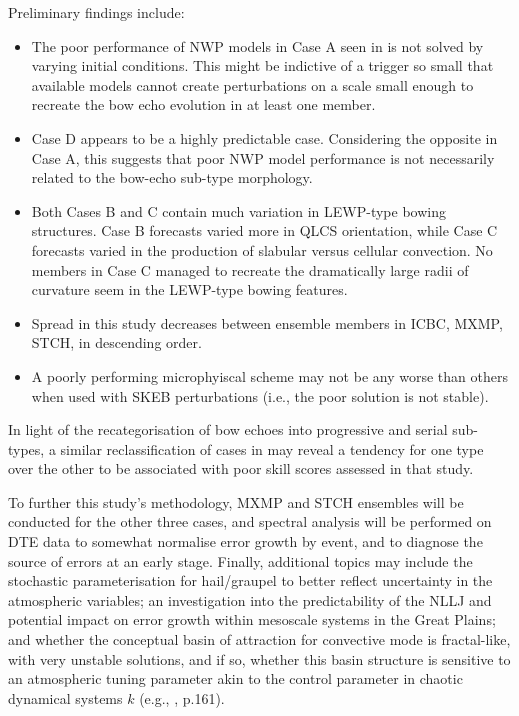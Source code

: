 \documentclass{ametsoc}
\begin{document}
{Preliminary findings include:

\begin{itemize}
\item The poor performance of NWP models in Case A seen in \citet{Snively2014-pr} is not solved by varying initial conditions. This might be indictive of a trigger so small that available models cannot create perturbations on a scale small enough to recreate the bow echo evolution in at least one member.
\item Case D appears to be a highly predictable case. Considering the opposite in Case A, this suggests that poor NWP model performance is not necessarily related to the bow-echo sub-type morphology.
\item Both Cases B and C contain much variation in LEWP-type bowing structures. Case B forecasts varied more in QLCS orientation, while Case C forecasts varied in the production of slabular versus cellular convection. No members in Case C managed to recreate the dramatically large radii of curvature seem in the LEWP-type bowing features.
\item Spread in this study decreases between ensemble members in ICBC, MXMP, STCH, in descending order.
\item A poorly performing microphyiscal scheme may not be any worse than others when used with SKEB perturbations (i.e., the poor solution is not stable).
\end{itemize}

In light of the recategorisation of bow echoes into progressive and serial sub-types, a similar reclassification of cases in \citet{Snively2014-pr} may reveal a tendency for one type over the other to be associated with poor skill scores assessed in that study. 

To further this study's methodology, MXMP and STCH ensembles will be conducted for the other three cases, and spectral analysis will be performed on DTE data to somewhat normalise error growth by event, and to diagnose the source of errors at an early stage. Finally, additional topics may include the stochastic parameterisation for hail/graupel to better reflect uncertainty in the atmospheric variables; an investigation into the predictability of the NLLJ and potential impact on error growth within mesoscale systems in the Great Plains; and whether the conceptual basin of attraction for convective mode is fractal-like, with very unstable solutions, and if so, whether this basin structure is sensitive to an atmospheric tuning parameter akin to the control parameter in chaotic dynamical systems $k$ (e.g., \citealt{Williams1997-yg}, p.161).

}
\end{document}
